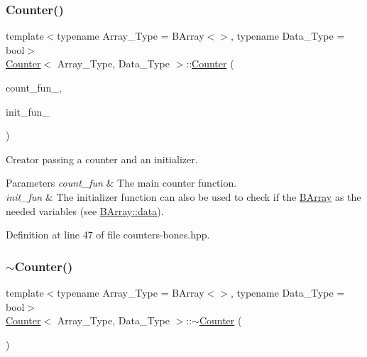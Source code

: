 \mbox{\label{class_counter_a6085b2ef220e2706c9558001f76125bd}} 
\subsubsection{\texorpdfstring{Counter()}{Counter()}\hspace{0.1cm}{\footnotesize\ttfamily [3/3]}}
{\footnotesize\ttfamily template$<$typename Array\+\_\+\+Type = B\+Array$<$$>$, typename Data\+\_\+\+Type = bool$>$ \\
\hyperlink{class_counter}{Counter}$<$ Array\+\_\+\+Type, Data\+\_\+\+Type $>$\+::\hyperlink{class_counter}{Counter} (\begin{DoxyParamCaption}\item[{\hyperlink{typedefs_8hpp_ac0160f52f564dea3ac033b374cffbfe7}{Counter\+\_\+fun\+\_\+type}$<$ Array\+\_\+\+Type, Data\+\_\+\+Type $>$}]{count\+\_\+fun\+\_\+,  }\item[{\hyperlink{typedefs_8hpp_ac0160f52f564dea3ac033b374cffbfe7}{Counter\+\_\+fun\+\_\+type}$<$ Array\+\_\+\+Type, Data\+\_\+\+Type $>$}]{init\+\_\+fun\+\_\+ }\end{DoxyParamCaption})\hspace{0.3cm}{\ttfamily [inline]}}



Creator passing a counter and an initializer. 


\begin{DoxyParams}{Parameters}
{\em count\+\_\+fun} & The main counter function. \\
\hline
{\em init\+\_\+fun} & The initializer function can also be used to check if the {\ttfamily \hyperlink{class_b_array}{B\+Array}} as the needed variables (see \hyperlink{class_b_array_a9576163b52124021575e50dbcca2f6b9}{B\+Array\+::data}). \\
\hline
\end{DoxyParams}


Definition at line 47 of file counters-\/bones.\+hpp.

\mbox{\label{class_counter_a66594b4ffbbf337241b032c1f039b3c0}} 
\subsubsection{\texorpdfstring{$\sim$\+Counter()}{~Counter()}}
{\footnotesize\ttfamily template$<$typename Array\+\_\+\+Type = B\+Array$<$$>$, typename Data\+\_\+\+Type = bool$>$ \\
\hyperlink{class_counter}{Counter}$<$ Array\+\_\+\+Type, Data\+\_\+\+Type $>$\+::$\sim$\hyperlink{class_counter}{Counter} (\begin{DoxyParamCaption}{ }\end{DoxyParamCaption})\hspace{0.3cm}{\ttfamily [inline]}}



